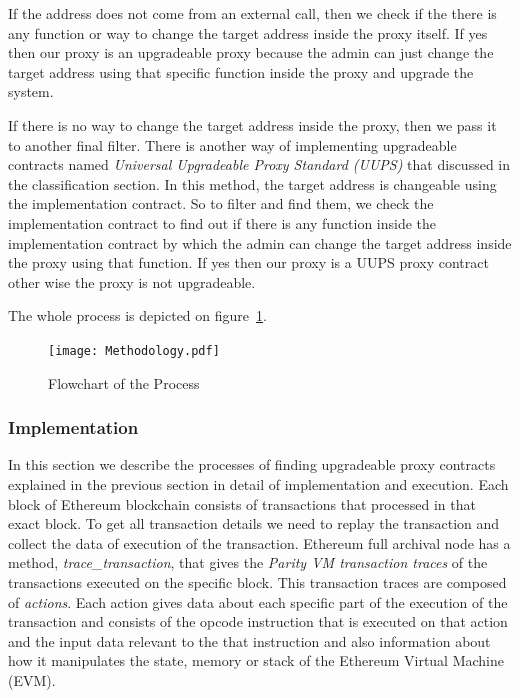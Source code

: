 If the address does not come from an external call, then we check if the there is any function or way to change the target address inside the proxy itself. If yes then our proxy is an upgradeable proxy because the admin can just change the target address using that specific function inside the proxy and upgrade the system.

If there is no way to change the target address inside the proxy, then we pass it to another final filter. There is another way of implementing upgradeable contracts named \textit{Universal Upgradeable Proxy Standard (UUPS)} that discussed in the classification section. In this method, the target address is changeable using the implementation contract. So to filter and find them, we check the implementation contract to find out if there is any function inside the implementation contract by which the admin can change the target address inside the proxy using that function. If yes then our proxy is a UUPS proxy contract other wise the proxy is not upgradeable.

The whole process is depicted on figure~\ref{flowchart}.

\begin{figure}[t]
  \texttt{[image: Methodology.pdf]}\label{flowchart}
  \caption{Flowchart of the Process}
\end{figure}


\subsubsection{Implementation}\label{findingProxies}
In this section we describe the processes of finding upgradeable proxy contracts explained in the previous section in detail of implementation and execution. 
Each block of Ethereum blockchain consists of transactions that processed in that exact block. To get all transaction details we need to replay the transaction and collect the data of execution of the transaction. Ethereum full archival node has a method, \textit{trace\_transaction}, that gives the \textit{Parity VM transaction traces} of the transactions executed on the specific block. This transaction traces are composed of \textit{actions}. Each action gives data about each specific part of the execution of the transaction and consists of the opcode instruction that is executed on that action and the input data relevant to the that instruction and also information about how it manipulates the state, memory or stack of the Ethereum Virtual Machine (EVM). 

